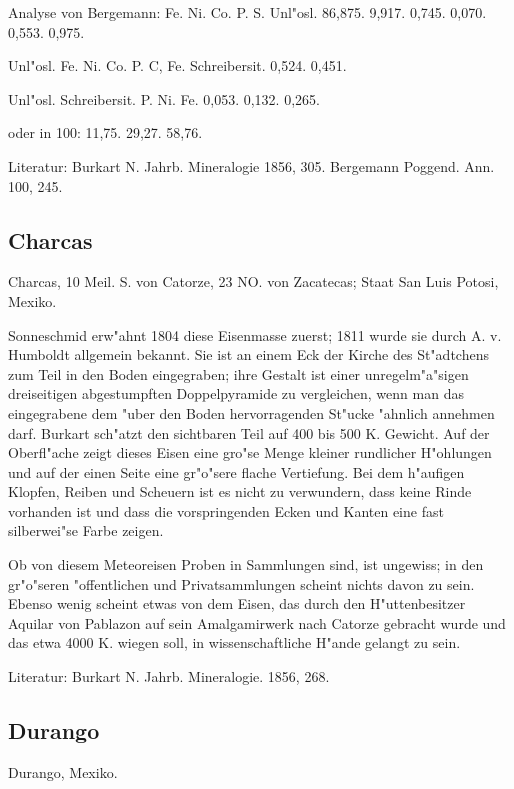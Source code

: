\documentclass[a4paper, 11pt, oneside]{article}
\begin{document}
Analyse von Bergemann:
Fe. Ni. Co. P. S.  Unl"osl.  
86,875. 9,917. 0,745. 0,070. 0,553. 0,975.

Unl"osl. {  
Fe. Ni. Co. P. C, Fe. Schreibersit.  
0,524. 0,451.  
}

Unl"osl. Schreibersit. {
P. Ni. Fe.  
0,053. 0,132. 0,265.  
}

oder in 100: 11,75. 29,27. 58,76.

Literatur: Burkart N. Jahrb. Mineralogie 1856, 305. Bergemann Poggend. Ann. 100, 245.

\subsection{Charcas}

Charcas, 10 Meil. S. von Catorze, 23 NO. von Zacatecas; Staat San Luis Potosi, Mexiko.

Sonneschmid erw"ahnt 1804 diese Eisenmasse zuerst; 1811 wurde sie durch A. v. Humboldt allgemein bekannt. Sie ist an einem Eck der Kirche des St"adtchens zum Teil in den Boden eingegraben; ihre Gestalt ist einer unregelm"a"sigen dreiseitigen abgestumpften Doppelpyramide zu vergleichen, wenn man das eingegrabene dem "uber den Boden hervorragenden St"ucke "ahnlich annehmen darf. Burkart sch"atzt den sichtbaren Teil auf 400 bis 500 K. Gewicht. Auf der Oberfl"ache zeigt dieses Eisen eine gro"se Menge kleiner rundlicher H"ohlungen und auf der einen Seite eine gr"o"sere flache Vertiefung. Bei dem h"aufigen Klopfen, Reiben und Scheuern ist es nicht zu verwundern, dass keine Rinde vorhanden ist und dass die vorspringenden Ecken und Kanten eine fast silberwei"se Farbe zeigen.

Ob von diesem Meteoreisen Proben in Sammlungen sind, ist ungewiss; in den gr"o"seren "offentlichen und Privatsammlungen scheint nichts davon zu sein. Ebenso wenig scheint etwas von dem Eisen, das durch den H"uttenbesitzer Aquilar von Pablazon auf sein Amalgamirwerk nach Catorze gebracht wurde und das etwa 4000 K. wiegen soll, in wissenschaftliche H"ande gelangt zu sein.

Literatur: Burkart N. Jahrb. Mineralogie. 1856, 268.

\subsection{Durango}

Durango, Mexiko.
\end{document}
